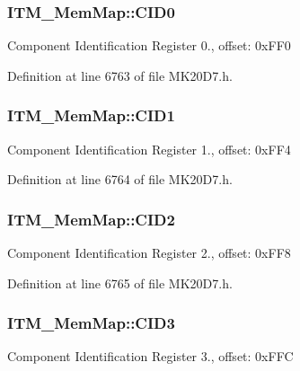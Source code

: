 \subsubsection[{\texorpdfstring{C\+I\+D0}{CID0}}]{ I\+T\+M\+\_\+\+Mem\+Map\+::\+C\+I\+D0}\hypertarget{struct_i_t_m___mem_map_aa106970486025d57f6bd43ce99ce1b2a}{}\label{struct_i_t_m___mem_map_aa106970486025d57f6bd43ce99ce1b2a}
Component Identification Register 0., offset\+: 0x\+F\+F0 

Definition at line 6763 of file M\+K20\+D7.\+h.

\subsubsection[{\texorpdfstring{C\+I\+D1}{CID1}}]{ I\+T\+M\+\_\+\+Mem\+Map\+::\+C\+I\+D1}\hypertarget{struct_i_t_m___mem_map_ac41c2c8d78aa8c7bf579da2e2b587a76}{}\label{struct_i_t_m___mem_map_ac41c2c8d78aa8c7bf579da2e2b587a76}
Component Identification Register 1., offset\+: 0x\+F\+F4 

Definition at line 6764 of file M\+K20\+D7.\+h.

\subsubsection[{\texorpdfstring{C\+I\+D2}{CID2}}]{ I\+T\+M\+\_\+\+Mem\+Map\+::\+C\+I\+D2}\hypertarget{struct_i_t_m___mem_map_a5048e832d89ab50cad8978e9169bcb9d}{}\label{struct_i_t_m___mem_map_a5048e832d89ab50cad8978e9169bcb9d}
Component Identification Register 2., offset\+: 0x\+F\+F8 

Definition at line 6765 of file M\+K20\+D7.\+h.

\subsubsection[{\texorpdfstring{C\+I\+D3}{CID3}}]{ I\+T\+M\+\_\+\+Mem\+Map\+::\+C\+I\+D3}\hypertarget{struct_i_t_m___mem_map_a0cd6f004d85bdf3734763af74927cd2f}{}\label{struct_i_t_m___mem_map_a0cd6f004d85bdf3734763af74927cd2f}
Component Identification Register 3., offset\+: 0x\+F\+FC 

